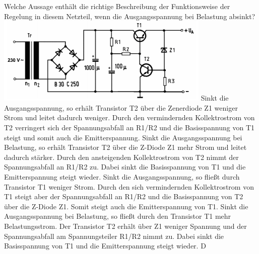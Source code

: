 {Welche Aussage enthält die richtige Beschreibung der Funktionsweise der Regelung in diesem Netzteil, wenn die Ausgangsspannung bei Belastung absinkt?\\ \includegraphics[scale=0.6]{Schaltungstechnik/Bilder/TD306.png}}%
{Sinkt die Ausgangsspannung, so erhält Transistor T2 über die Zenerdiode Z1 weniger Strom und leitet dadurch weniger. Durch den vermindernden Kollektrostrom von T2 verringert sich der Spannungsabfall an R1/R2 und die Basisspannung von T1 steigt und somit auch die Emitterspannung.}%
{Sinkt die Ausgangsspannung bei Belastung, so erhält Transistor T2 über die Z-Diode Z1 mehr Strom und leitet dadurch stärker. Durch den ansteigenden Kollektrostrom von T2 nimmt der Spannungsabfall an R1/R2 zu. Dabei sinkt die Basisspannung von T1 und die Emitterspannung steigt wieder.}%
{Sinkt die Ausgangsspannung, so fließt durch Transistor T1 weniger Strom. Durch den sich vermindernden Kollektrostrom von T1 steigt aber der Spannungsabfall an R1/R2 und die Basisspannung von T2 über die Z-Diode Z1. Somit steigt auch die Emitterspannung von T1.}%
{Sinkt die Ausgangsspannung bei Belastung, so fließt durch den Transistor T1 mehr Belastungsstrom. Der Transistor T2 erhält über Z1 weniger Spannung und der Spannungsabfall am Spannungsteiler R1/R2 nimmt zu. Dabei sinkt die Basisspannung von T1 und die Emitterspannung steigt wieder.}%
{D}%